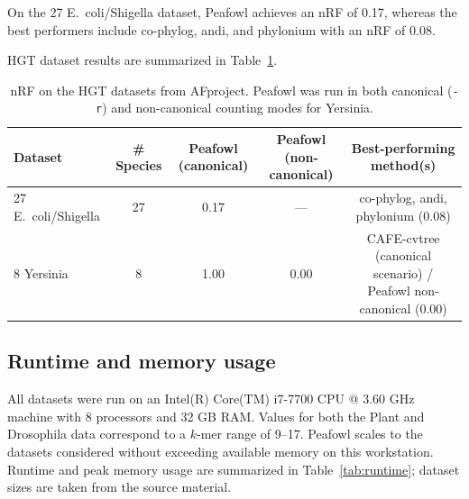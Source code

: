 \documentclass[11pt]{article}
\begin{document}
On the 27 E.~coli/Shigella dataset, Peafowl achieves an nRF of 0.17, whereas the best performers include co-phylog, andi, and phylonium with an nRF of 0.08.

HGT dataset results are summarized in Table~\ref{tab:hgt}.

\begin{table}[t]
\centering
\caption{nRF on the HGT datasets from AFproject. Peafowl was run in both canonical ({\tt -r}) and non-canonical counting modes for Yersinia.}
\label{tab:hgt}
\begin{tabular}{lcccc}
\toprule
Dataset & \# Species & Peafowl (canonical) & Peafowl (non-canonical) & Best-performing method(s) \\
\midrule
27 E.~coli/Shigella & 27 & 0.17 & ---  & co-phylog, andi, phylonium (0.08) \\
8 Yersinia          &  8 & 1.00 & 0.00 & CAFE-cvtree (canonical scenario) / Peafowl non-canonical (0.00) \\
\bottomrule
\end{tabular}
\end{table}

\subsection{Runtime and memory usage}

All datasets were run on an Intel(R) Core(TM) i7-7700 CPU @ 3.60 GHz machine with 8 processors and 32 GB RAM. Values for both the Plant and Drosophila data correspond to a $k$-mer range of 9--17. Peafowl scales to the datasets considered without exceeding available memory on this workstation. Runtime and peak memory usage are summarized in Table~\ref{tab:runtime}; dataset sizes are taken from the source material.
\end{document}
